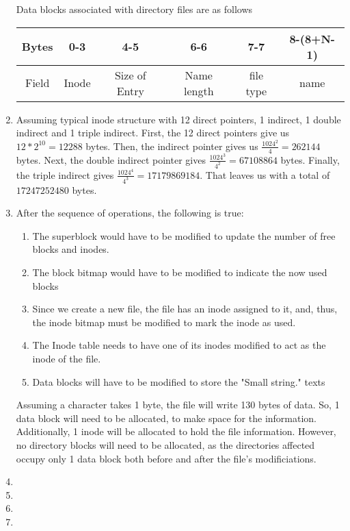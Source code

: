 \documentclass[12pt,letterpaper]{report}
\begin{document}
\begin{enumerate}
Data blocks associated with directory files are as follows\\
\begin{tabular}{|c|c|c|c|c|c|}
\hline
Bytes & 0-3 & 4-5 & 6-6 & 7-7 & 8-(8+N-1) \\
\hline
Field & Inode & Size of Entry & Name length & file type & name\\
\hline
\end{tabular}
\item Assuming typical inode structure with 12 direct pointers, 1 indirect, 1 double indirect and 1 triple indirect. First, the 12 direct pointers give us $12 * 2^{10} = 12288$ bytes. Then, the indirect pointer gives us $\frac{1024^2}{4} = 262144$ bytes. Next, the double indirect pointer gives $\frac{1024^3}{4^2} = 67108864$ bytes. Finally, the triple indirect gives $\frac{1024^4}{4^3} = 17179869184$. That leaves us with a total of $17247252480$ bytes.

\item After the sequence of operations, the following is true:
\begin{enumerate}
\item The superblock would have to be modified to update the number of free blocks and
inodes.
\item The block bitmap would have to be modified to indicate the now used blocks
\item Since we create a new file, the file has an inode assigned to it, and, thus,
the inode bitmap must be modified to mark the inode as used.
\item The Inode table needs to have one of its inodes modified to act as the inode of the
file. 
\item Data blocks will have to be modified to store the "Small string." texts
\end{enumerate}
Assuming a character takes 1 byte, the file will write 130 bytes of data. So, 1 data block
will need to be allocated, to make space for the information. Additionally, 1 inode will be
allocated to hold the file information. However, no directory blocks will need to be
allocated, as the directories affected occupy only 1 data block both before and after the
file's modificiations. 
\item

\item

\item

\item



\end{enumerate}
\end{document}
